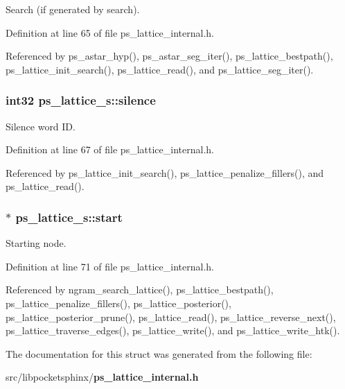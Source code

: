 Search (if generated by search). 



Definition at line 65 of file ps\+\_\+lattice\+\_\+internal.\+h.



Referenced by ps\+\_\+astar\+\_\+hyp(), ps\+\_\+astar\+\_\+seg\+\_\+iter(), ps\+\_\+lattice\+\_\+bestpath(), ps\+\_\+lattice\+\_\+init\+\_\+search(), ps\+\_\+lattice\+\_\+read(), and ps\+\_\+lattice\+\_\+seg\+\_\+iter().

\subsubsection[{silence}]{\setlength{\rightskip}{0pt plus 5cm}int32 ps\+\_\+lattice\+\_\+s\+::silence}\label{structps__lattice__s_acd3f3ab2649f649ba33bf2a422cf12b8}


Silence word I\+D. 



Definition at line 67 of file ps\+\_\+lattice\+\_\+internal.\+h.



Referenced by ps\+\_\+lattice\+\_\+init\+\_\+search(), ps\+\_\+lattice\+\_\+penalize\+\_\+fillers(), and ps\+\_\+lattice\+\_\+read().

\subsubsection[{start}]{$\ast$ ps\+\_\+lattice\+\_\+s\+::start}\label{structps__lattice__s_a5d936695a3813e117d20b585d48db8fe}


Starting node. 



Definition at line 71 of file ps\+\_\+lattice\+\_\+internal.\+h.



Referenced by ngram\+\_\+search\+\_\+lattice(), ps\+\_\+lattice\+\_\+bestpath(), ps\+\_\+lattice\+\_\+penalize\+\_\+fillers(), ps\+\_\+lattice\+\_\+posterior(), ps\+\_\+lattice\+\_\+posterior\+\_\+prune(), ps\+\_\+lattice\+\_\+read(), ps\+\_\+lattice\+\_\+reverse\+\_\+next(), ps\+\_\+lattice\+\_\+traverse\+\_\+edges(), ps\+\_\+lattice\+\_\+write(), and ps\+\_\+lattice\+\_\+write\+\_\+htk().



The documentation for this struct was generated from the following file\+:\begin{DoxyCompactItemize}
\item 
src/libpocketsphinx/{\bf ps\+\_\+lattice\+\_\+internal.\+h}\end{DoxyCompactItemize}
